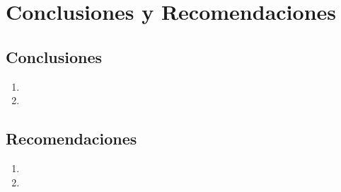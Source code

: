 \chapter{Conclusiones y Recomendaciones}

\section{Conclusiones}
\begin{enumerate}
    \item \lipsum[8]
    \item \lipsum[9]
\end{enumerate}

\newpage

\section{Recomendaciones}

\begin{enumerate}
    \item \lipsum[11]
    \item \lipsum[8]
\end{enumerate}

